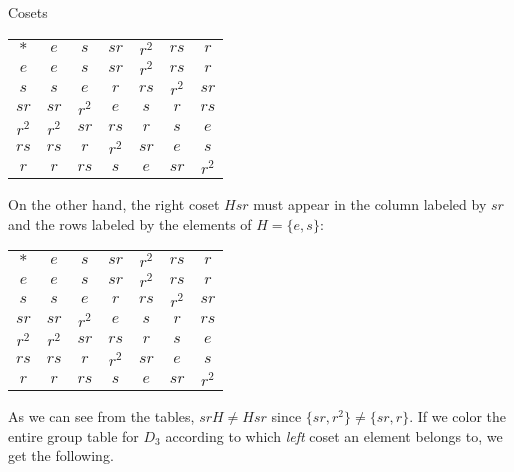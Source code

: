 \begin{section}{Cosets}
\begin{center}
\begin{tabular}{c!{\vrule width 2pt}c|c|c|c|c|c}
$*$ & $e$ & $s$ & $sr$ & $r^2$ & $rs$ & $r$ \\ 
$e$ & $e$ & $s$ & $sr$ & $r^2$ & $rs$ & $r$\\
\hline $s$ & $s$ & $e$ & $r$ & $rs$ & $r^2$ & $sr$ \\
\hline {}$sr$ & $sr$ & $r^2$ & $e$ & $s$ & $r$ & $rs$\\
\hline $r^2$ & $r^2$ & $sr$ & $rs$ & $r$ & $s$ & $e$\\
\hline $rs$ & $rs$ & $r$ & $r^2$ & $sr$ & $e$ & $s$\\
\hline $r$ & $r$ & $rs$ & $s$ & $e$ & $sr$ & $r^2$\\
\end{tabular}
\end{center}
On the other hand, the right coset $Hsr$ must appear in the column labeled by $sr$ and the rows labeled by the elements of $H=\{e,s\}$:
\begin{center}
\begin{tabular}{c!{\vrule width 2pt}c|c|c|c|c|c}
$*$ & $e$ & $s$ & $sr$ & $r^2$ & $rs$ & $r$ \\ 
$e$ & $e$ & $s$ & $sr$ & $r^2$ & $rs$ & $r$\\
\hline {}$s$ & $s$ & $e$ & $r$ & $rs$ & $r^2$ & $sr$ \\
\hline $sr$ & $sr$ & $r^2$ & $e$ & $s$ & $r$ & $rs$\\
\hline $r^2$ & $r^2$ & $sr$ & $rs$ & $r$ & $s$ & $e$\\
\hline $rs$ & $rs$ & $r$ & $r^2$ & $sr$ & $e$ & $s$\\
\hline $r$ & $r$ & $rs$ & $s$ & $e$ & $sr$ & $r^2$\\
\end{tabular}
\end{center}
As we can see from the tables, $srH\neq Hsr$ since $\{sr,r^2\}\neq \{sr,r\}$.  If we color the entire group table for $D_3$ according to which \emph{left} coset an element belongs to, we get the following.
 

\end{section}
